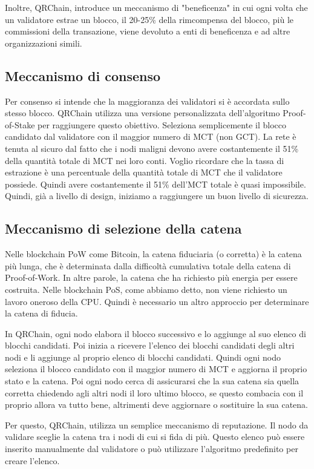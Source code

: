 Inoltre, QRChain, introduce un meccanismo di "beneficenza" in cui ogni volta che un validatore estrae un blocco, il 20-25\% della rimcompensa del blocco, più le commissioni della transazione, viene devoluto a enti di beneficenza e ad altre organizzazioni simili.

\subsection{Meccanismo di consenso}
Per consenso si intende che la maggioranza dei validatori si è accordata sullo stesso blocco.
QRChain utilizza una versione personalizzata dell'algoritmo Proof-of-Stake per raggiungere questo obiettivo. Seleziona semplicemente il blocco candidato dal validatore con il maggior numero di MCT (non GCT).
La rete è tenuta al sicuro dal fatto che i nodi maligni devono avere costantemente il 51\% della quantità totale di MCT nei loro conti. Voglio ricordare che la tassa di estrazione è una percentuale della quantità totale di MCT che il validatore possiede. Quindi avere costantemente il 51\% dell'MCT totale è quasi impossibile. Quindi, già a livello di design, iniziamo a raggiungere un buon livello di sicurezza.

\subsection{Meccanismo di selezione della catena}
Nelle blockchain PoW come Bitcoin, la catena fiduciaria (o corretta) è la catena più lunga, che è determinata dalla difficoltà cumulativa totale della catena di Proof-of-Work. In altre parole, la catena che ha richiesto più energia per essere costruita.
Nelle blockchain PoS, come abbiamo detto, non viene richiesto un lavoro oneroso della CPU. Quindi è necessario un altro approccio per determinare la catena di fiducia.

In QRChain, ogni nodo elabora il blocco successivo e lo aggiunge al suo elenco di blocchi candidati. Poi inizia a ricevere l'elenco dei blocchi candidati degli altri nodi e li aggiunge al proprio elenco di blocchi candidati.
Quindi ogni nodo seleziona il blocco candidato con il maggior numero di MCT e aggiorna il proprio stato e la catena.
Poi ogni nodo cerca di assicurarsi che la sua catena sia quella corretta chiedendo agli altri nodi il loro ultimo blocco, se questo combacia con il proprio allora va tutto bene, altrimenti deve aggiornare o sostituire la sua catena.

Per questo, QRChain, utilizza un semplice meccanismo di reputazione. Il nodo da validare sceglie la catena tra i nodi di cui si fida di più. Questo elenco può essere inserito manualmente dal validatore o può utilizzare l'algoritmo predefinito per creare l'elenco.

